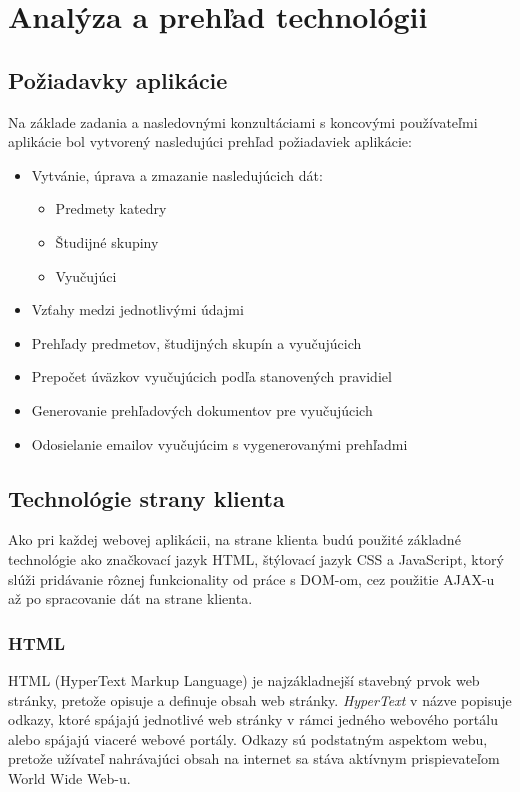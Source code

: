 \chapter{Analýza a prehľad technológii}

\section{Požiadavky aplikácie}

Na základe zadania a nasledovnými konzultáciami s koncovými používateľmi aplikácie bol vytvorený nasledujúci prehľad požiadaviek aplikácie:

\begin{itemize}
    \item Vytvánie, úprava a zmazanie nasledujúcich dát:
        \begin{itemize}
            \item Predmety katedry
            \item Študijné skupiny
            \item Vyučujúci
        \end{itemize}
    \item Vzťahy medzi jednotlivými údajmi
    \item Prehľady predmetov, študijných skupín a vyučujúcich
    \item Prepočet úväzkov vyučujúcich podľa stanovených pravidiel
    \item Generovanie prehľadových dokumentov pre vyučujúcich
    \item Odosielanie emailov vyučujúcim s vygenerovanými prehľadmi
\end{itemize}

\section{Technológie strany klienta}
Ako pri každej webovej aplikácii, na strane klienta budú použité základné technológie ako značkovací jazyk HTML, štýlovací jazyk CSS a JavaScript, ktorý slúži pridávanie rôznej funkcionality od práce s DOM-om, cez použitie AJAX-u až po spracovanie dát na strane klienta.

\subsection*{HTML}

HTML (HyperText Markup Language) je najzákladnejší stavebný prvok web stránky, pretože opisuje a definuje obsah web stránky. \emph{HyperText} v názve popisuje odkazy, ktoré spájajú jednotlivé web stránky v rámci jedného webového portálu alebo spájajú viaceré webové portály. Odkazy sú podstatným aspektom webu, pretože užívateľ nahrávajúci obsah na internet sa stáva aktívnym prispievateľom World Wide Web-u. \citep{web:html}

